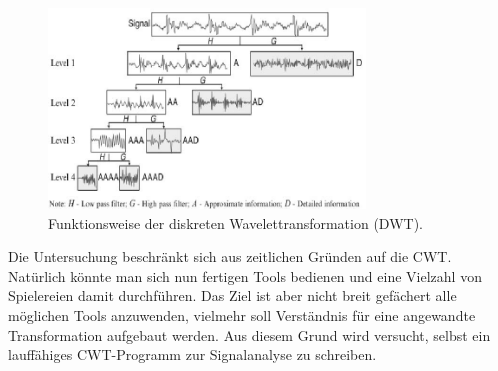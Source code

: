 \begin{figure}
	\centering
	\includegraphics[width=0.75\textwidth]{papers/wavelets/images/1_Four-Level-Wavelet-Decomposition.png}
	\caption{\cite{wavelets:Haider.2015} Funktionsweise der diskreten Wavelettransformation (DWT).}
	\label{wavelet:fig:1_Four-Level-Wavelet-Decomposition}
\end{figure}

Die Untersuchung beschränkt sich aus zeitlichen Gründen auf die CWT.
Natürlich könnte man sich nun fertigen Tools bedienen und eine
Vielzahl von Spielereien damit durchführen.
Das Ziel ist aber nicht breit gefächert alle möglichen Tools
anzuwenden, vielmehr soll Verständnis für eine angewandte Transformation
aufgebaut werden.
Aus diesem Grund wird versucht, selbst ein lauffähiges CWT-Programm
zur Signalanalyse zu schreiben.

